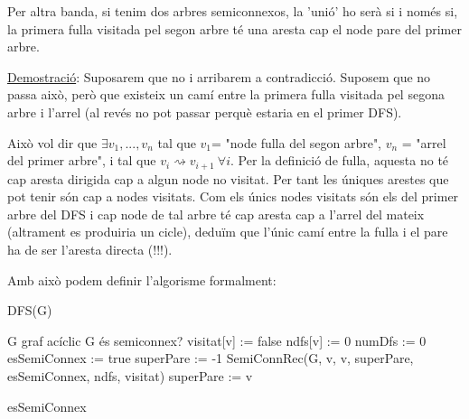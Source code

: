 \documentclass[a4paper,12pt]{article}
\begin{document}
Per altra banda, si tenim dos arbres semiconnexos, la 'unió' ho serà si i només si, la primera fulla visitada pel segon arbre té una aresta cap el node pare del primer arbre.

\underline{Demostració}: Suposarem que no i arribarem a contradicció.
Suposem que no passa això, però que existeix un camí entre la primera fulla visitada pel segona arbre i l'arrel (al revés no pot passar perquè estaria en el primer DFS). 

Això vol dir que $\exists v_1,...,v_n$ tal que $v_1$= "node fulla del segon arbre",  $v_n$ = "arrel del primer arbre", i tal que $v_i \rightsquigarrow v_{i+1} \ \forall i$. Per la definició de fulla, aquesta no té cap aresta dirigida cap a algun node no visitat. Per tant les úniques arestes que pot tenir són cap a nodes visitats. Com els únics nodes visitats són els del primer arbre del DFS i cap node de tal arbre té cap aresta cap a l'arrel del mateix (altrament es produiria un cicle), deduïm que l'únic camí entre la fulla i el pare ha de ser l'aresta directa (!!!).

Amb això podem definir l'algorisme formalment:

\newpage

\begin{algorithm}[H]
    \caption{DFS(G)}
    \begin{algorithmic}[1]  %
        \Require G graf acíclic
        \Ensure G és semiconnex?
            \State visitat[v] := false
            \State ndfs[v] := 0
        \EndFor
        \State
        \State numDfs := 0
        \State esSemiConnex := true
        \State superPare := -1
        \State
                \State SemiConnRec(G, v, v, superPare, esSemiConnex, ndfs, visitat)
                \State superPare := v
            \EndIf
        \EndFor

        \State \Return esSemiConnex
    \end{algorithmic}
\end{algorithm}
\end{document}
